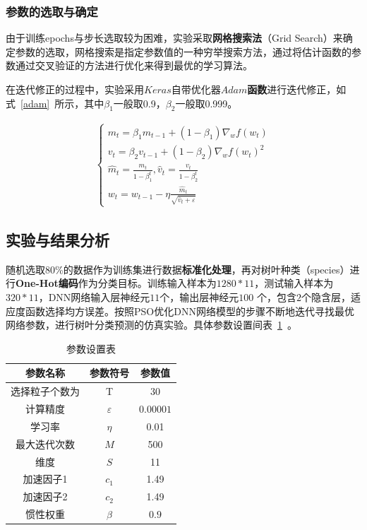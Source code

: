 \documentclass{whutmod}
\begin{document}
	\subsubsection{参数的选取与确定}
	由于训练epochs与步长选取较为困难，实验采取\textbf{网格搜索法}（Grid Search）来确定参数的选取，网格搜索是指定参数值的一种穷举搜索方法，通过将估计函数的参数通过交叉验证的方法进行优化来得到最优的学习算法。
	
	在迭代修正的过程中，实验采用$Keras$自带优化器\textbf{$Adam$函数}进行迭代修正，如式~\ref{adam}~所示，其中$\beta_{1}$一般取0.9，$\beta_{2}$一般取0.999。
	
	\begin{gather*}\label{adam}
	\left\{\begin{array}{l}{m_{t}=\beta_{1} m_{t-1}+\left(1-\beta_{1}\right) \nabla_{w} f\left(w_{t}\right)} \\ {v_{t}=\beta_{2} v_{t-1}+\left(1-\beta_{2}\right) \nabla_{w} f\left(w_{t}\right)^{2}} \\ {\widehat{m}_{t}=\frac{m_{t}}{1-\beta_{1}^{t}}, \hat{v}_{t}=\frac{v_{t}}{1-\beta_{2}^{t}}} \\ {w_{t}=w_{t-1}-\eta \frac{\widehat{m}_{t}}{\sqrt{\hat{v}_{t}+\varepsilon}}}\end{array}\right.
	\end{gather*}


	\subsection{实验与结果分析}
	随机选取80\%的数据作为训练集进行数据\textbf{标准化处理}，再对树叶种类（species）进行\textbf{One-Hot编码}作为分类目标。训练输入样本为$1280*11$，测试输入样本为$320*11$，DNN网络输入层神经元$11$个，输出层神经元$100$ 个，包含$2$个隐含层，适应度函数选择均方误差。按照PSO优化DNN网络模型的步骤不断地迭代寻找最优网络参数，进行树叶分类预测的仿真实验。具体参数设置间表~\ref{canshu}~。
			\begin{table}[H]
		\centering
		\begin{tabular}{ccc}
			\toprule[2pt]
			\multicolumn{1}{m{4cm}}{\centering 参数名称}
			& \multicolumn{1}{m{3cm}}{\centering 参数符号}
			&\multicolumn{1}{m{3cm}}{\centering 参数值}
			\\
			\midrule[1pt]
			选择粒子个数为	 &  T &$30$ \\ 
			计算精度	 &  $\varepsilon$&$0.00001$  \\ 
			学习率	 &  $\eta $ &0.01 \\ 
			最大迭代次数	 &  $M$ &500\\ 
						维度	 &  $S$ &11 \\ 
									加速因子1	 &  $c_{1}$ &1.49\\ 
												加速因子2	 &  $c_{2}$ &1.49 \\ 
			惯性权重	 &  $\beta $ &$0.9$ \\ 
			\bottomrule[2pt]	
		\end{tabular}
		\caption{参数设置表}\label{canshu}
	\end{table}
	
\end{document}
